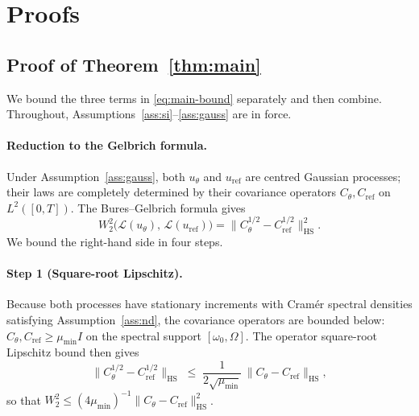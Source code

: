 \documentclass[11pt,a4paper]{article}
\newcommand{\HS}{\mathrm{HS}}
\begin{document}
\appendix
\section{Proofs}

\subsection{Proof of Theorem~\ref{thm:main}}

We bound the three terms in \eqref{eq:main-bound} separately and then
combine. Throughout, Assumptions~\ref{ass:si}--\ref{ass:gauss} are in force.

\paragraph{Reduction to the Gelbrich formula.}
Under Assumption~\ref{ass:gauss}, both $u_\theta$ and $u_{\mathrm{ref}}$
are centred Gaussian processes; their laws are completely determined by
their covariance operators $C_\theta, C_{\mathrm{ref}}$ on $L^2([0,T])$.
The Bures--Gelbrich formula \citep{gelbrich1990formula} gives
\begin{equation}\label{eq:gelbrich-main}
 W_2^2\!\bigl(\mathcal{L}(u_\theta),\,\mathcal{L}(u_{\mathrm{ref}})\bigr)
 = \bigl\|C_\theta^{1/2} - C_{\mathrm{ref}}^{1/2}\bigr\|_{\HS}^2.
\end{equation}
We bound the right-hand side in four steps.

\paragraph{Step 1 (Square-root Lipschitz).}
Because both processes have stationary increments with Cram\'er spectral
densities satisfying Assumption~\ref{ass:nd}, the covariance operators are
bounded below: $C_\theta, C_{\mathrm{ref}} \geq \mu_{\min} I$ on the
spectral support $[\omega_0,\Omega]$. The operator square-root Lipschitz
bound \citep[Thm.~X.1.1]{bhatia1997matrix} then gives
\begin{equation}\label{eq:sqrt-lip}
 \bigl\|C_\theta^{1/2} - C_{\mathrm{ref}}^{1/2}\bigr\|_{\HS}
 \;\leq\;
 \frac{1}{2\sqrt{\mu_{\min}}}\,
 \bigl\|C_\theta - C_{\mathrm{ref}}\bigr\|_{\HS},
\end{equation}
so that $W_2^2 \leq (4\mu_{\min})^{-1}\|C_\theta - C_{\mathrm{ref}}\|_{\HS}^2$.
\end{document}
